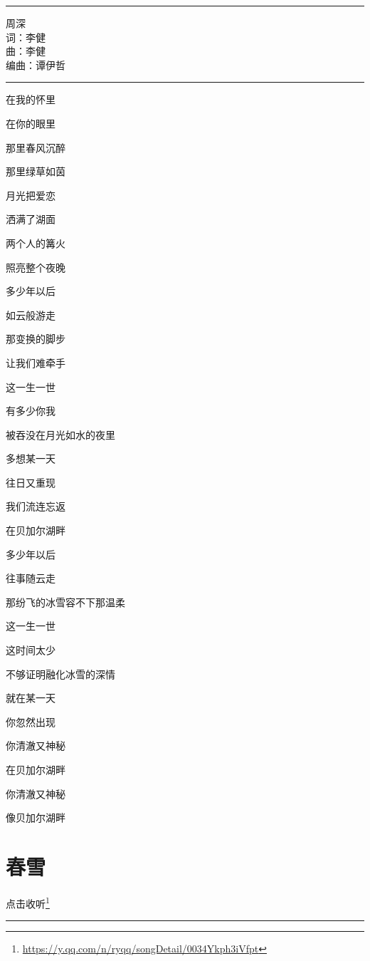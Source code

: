 \documentclass[]{ctexbook}
\renewcommand{\href}[2]{#2\footnote{\url{#1}}}
\begin{document}
\begin{center}\rule{0.5\linewidth}{0.5pt}\end{center}

周深\\
词：李健\\
曲：李健\\
编曲：谭伊哲

\begin{center}\rule{0.5\linewidth}{0.5pt}\end{center}

在我的怀里

在你的眼里

那里春风沉醉

那里绿草如茵

月光把爱恋

洒满了湖面

两个人的篝火

照亮整个夜晚

多少年以后

如云般游走

那变换的脚步

让我们难牵手

这一生一世

有多少你我

被吞没在月光如水的夜里

多想某一天

往日又重现

我们流连忘返

在贝加尔湖畔

多少年以后

往事随云走

那纷飞的冰雪容不下那温柔

这一生一世

这时间太少

不够证明融化冰雪的深情

就在某一天

你忽然出现

你清澈又神秘

在贝加尔湖畔

你清澈又神秘

像贝加尔湖畔

\section*{春雪}\label{spring-snow}


\href{https://y.qq.com/n/ryqq/songDetail/0034Ykph3iVfpt}{点击收听}

\begin{center}\rule{0.5\linewidth}{0.5pt}\end{center}
\end{document}
